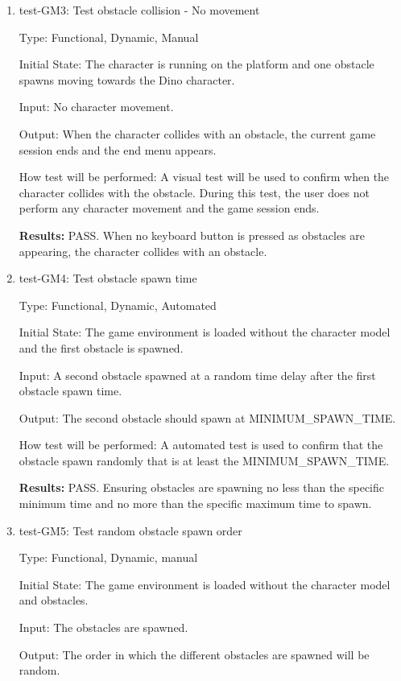 \documentclass[12pt, titlepage]{article}
\begin{document}
\begin{enumerate}
\item{test-GM3: Test obstacle collision - No movement\\}

Type: Functional, Dynamic, Manual
					
Initial State: The character is running on the platform and one obstacle spawns moving towards the Dino character.
					
Input: No character movement.
					
Output: When the character collides with an obstacle, the current game session ends and the end menu appears.
					
How test will be performed: A visual test will be used to confirm when the character collides with the obstacle. During this test, the user does not perform any character movement and the game session ends.

\textbf{Results:} PASS. When no keyboard button is pressed as obstacles are appearing, the character collides with an obstacle. 


\item{test-GM4: Test obstacle spawn time\\}

Type: Functional, Dynamic, Automated
					
Initial State: The game environment is loaded without the character model and the first obstacle is spawned.
					
Input: A second obstacle spawned at a random time delay after the first obstacle spawn time.  
					
Output: The second obstacle should spawn at MINIMUM\_SPAWN\_TIME. 
					
How test will be performed: A automated test is used to confirm that the obstacle spawn randomly that is at least the MINIMUM\_SPAWN\_TIME.

\textbf{Results:} PASS. Ensuring obstacles are spawning no less than the specific minimum time and no more than the specific maximum time to spawn. 

\item{test-GM5: Test random obstacle spawn order\\}

Type: Functional, Dynamic, manual
					
Initial State: The game environment is loaded without the character model and obstacles.
					
Input: The obstacles are spawned.  
					
Output: The order in which the different obstacles are spawned will be random. 
					

\end{enumerate}
\end{document}

